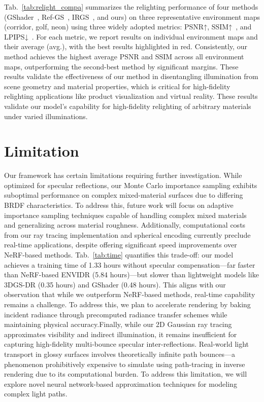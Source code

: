 Tab.~\ref{tab:relight_compa} summarizes the relighting performance of four methods (GShader~\cite{jiang2024gaussianshader}, Ref-GS~\cite{yao2024refgaussian}, IRGS~\cite{gu2025irgs}, and ours) on three representative environment maps (corridor, golf, neon) using three widely adopted metrics: PSNR↑, SSIM↑~\cite{ssim}, and LPIPS↓~\cite{lpips}. For each metric, we report results on individual environment maps and their average (avg.), with the best results highlighted in red.  
Consistently, our method achieves the highest average PSNR and SSIM across all environment maps, outperforming the second-best method by significant margins. These results validate the effectiveness of our method in disentangling illumination from scene geometry and material properties, which is critical for high-fidelity relighting applications like product visualization and virtual reality.
These results validate our model's capability for high-fidelity relighting of arbitrary materials under varied illuminations.


\section{Limitation}
Our framework has certain limitations requiring further investigation. While optimized for specular reflections, our Monte Carlo importance sampling exhibits suboptimal performance on complex mixed-material surfaces due to differing BRDF characteristics. To address this, future work will focus on adaptive importance sampling techniques capable of handling complex mixed materials and generalizing across material roughness. Additionally, computational costs from our ray tracing implementation and spherical encoding currently preclude real-time applications, despite offering significant speed improvements over NeRF-based methods. Tab.~\ref{tab:time} quantifies this trade-off: our model achieves a training time of 1.33 hours without specular compensation—far faster than NeRF-based ENVIDR (5.84 hours)—but slower than lightweight models like 3DGS-DR (0.35 hours) and GShader (0.48 hours). This aligns with our observation that while we outperform NeRF-based methods, real-time capability remains a challenge. To address this, we plan to accelerate rendering by baking incident radiance through precomputed radiance transfer schemes while maintaining physical accuracy.Finally, while our 2D Gaussian ray tracing approximates visibility and indirect illumination, it remains insufficient for capturing high-fidelity multi-bounce specular inter-reflections. Real-world light transport in glossy surfaces involves theoretically infinite path bounces—a phenomenon prohibitively expensive to simulate using path-tracing in inverse rendering due to its computational burden. To address this limitation, we will explore novel neural network-based approximation techniques for modeling complex light paths.


